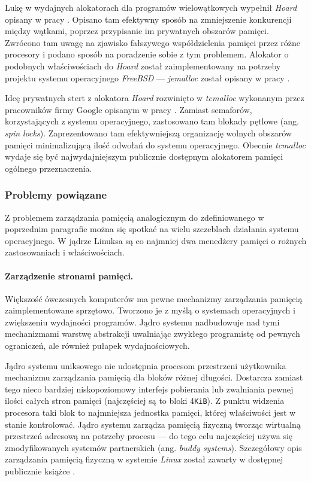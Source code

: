 \documentclass[12pt,a4paper,titlepage,twoside]{mwart}
\begin{document}
Lukę w wydajnych alokatorach dla programów wielowątkowych wypełnił
\textit{Hoard} opisany w pracy \cite{berger00hoard}. Opisano tam efektywny
sposób na zmniejszenie konkurencji między wątkami, poprzez przypisanie im
prywatnych obszarów pamięci. Zwrócono tam uwagę na zjawisko fałszywego
współdzielenia pamięci przez różne procesory i podano sposób na poradzenie
sobie z tym problemem. Alokator o podobnych właściwościach do \textit{Hoard}
został zaimplementowany na potrzeby projektu systemu operacyjnego
\textit{FreeBSD} --- \textit{jemalloc} został opisany w pracy
\cite{evans06scalable}.

Ideę prywatnych stert z alokatora \textit{Hoard} rozwinięto w
\textit{tcmalloc} wykonanym przez pracowników firmy Google opisanym w pracy
\cite{ghemawat07tcmalloc}. Zamiast semaforów, korzystających z systemu
operacyjnego, zastosowano tam blokady pętlowe (ang.  \textit{spin locks}).
Zaprezentowano tam efektywniejszą organizację wolnych obszarów pamięci
minimalizującą ilość odwołań do systemu operacyjnego.  Obecnie
\textit{tcmalloc} wydaje się być najwydajniejszym publicznie dostępnym
alokatorem pamięci ogólnego przeznaczenia.

\subsubsection{Problemy powiązane}

Z problemem zarządzania pamięcią analogicznym do zdefiniowanego w poprzednim
paragrafie można się spotkać na wielu szczeblach działania systemu
operacyjnego. W jądrze Linuksa są co najmniej dwa menedżery pamięci o rożnych
zastosowaniach i właściwościach.

\paragraph{Zarządzenie stronami pamięci.}

Większość ówczesnych komputerów ma pewne mechanizmy zarządzania pamięcią
zaimplementowane sprzętowo. Tworzono je z myślą o systemach operacyjnych i
zwiększeniu wydajności programów. Jądro systemu nadbudowuje nad tymi
mechanizmami warstwę abstrakcji uwalniając zwykłego programistę od pewnych
ograniczeń, ale również pułapek wydajnościowych.

Jądro systemu uniksowego nie udostępnia procesom przestrzeni użytkownika
mechanizmu zarządzania pamięcią dla bloków różnej długości. Dostarcza zamiast
tego nieco bardziej niskopoziomowy interfejs pobierania lub zwalniania pewnej
ilości całych stron pamięci (najczęściej są to bloki 4\verb+KiB+). Z punktu
widzenia procesora taki blok to najmniejsza jednostka pamięci, której
właściwości jest w stanie kontrolować. Jądro systemu zarządza pamięcią fizyczną
tworząc wirtualną przestrzeń adresową na potrzeby procesu --- do tego celu
najczęściej używa się zmodyfikowanych systemów partnerskich (ang. \textit{buddy
systems}). Szczegółowy opis zarządzania pamięcią fizyczną w systemie
\textit{Linux} został zawarty w dostępnej publicznie książce
\cite{gorman04linuxvm}.
\end{document}

